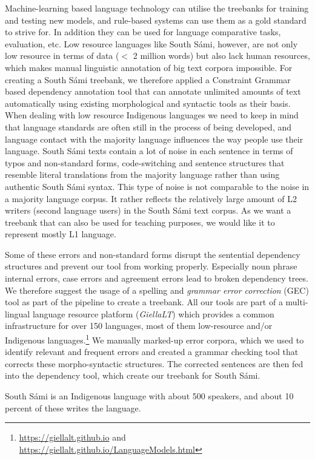 \documentclass[free]{flammie}
\begin{document}
Machine-learning based language technology can utilise the treebanks for
training and testing new models, and rule-based systems can use them as a gold
standard to strive for.  In addition they can be used for language comparative
tasks, evaluation, etc.  Low resource languages like South Sámi, however, are
not only low resource in terms of data ($<$ 2 million words) but also lack human
resources, which makes manual linguistic annotation of big text corpora
impossible.  For creating a South Sámi treebank, we therefore applied a
Constraint Grammar based dependency annotation tool that can annotate unlimited
amounts of text automatically using existing morphological and syntactic tools
as their basis.  When dealing with low resource Indigenous languages we need to
keep in mind that language standards are often still in the process of being
developed, and language contact with the majority language influences the way
people use their language. South Sámi texts contain a lot of noise in each
sentence in terms of typos and non-standard forms, code-switching and sentence
structures that resemble literal translations from the majority language rather
than using authentic South Sámi syntax.  This type of noise is not comparable to
the noise in a majority language corpus. It rather reflects the relatively large
amount of L2 writers (second language users) in the South Sámi text corpus. As
we want a treebank that can also be used for teaching purposes, we would like it
to represent mostly L1 language.

Some of these errors and non-standard forms disrupt the sentential dependency
structures and prevent our tool from working properly. Especially noun phrase
internal errors, case errors and agreement errors lead to broken dependency
trees.  We therefore suggest the usage of a spelling and \textit{grammar error
correction} (GEC) tool as part of the pipeline to create a treebank. All our
tools are part of a multi-lingual language resource platform (\textit{GiellaLT})
which provides a common infrastructure for over 150 languages, most of them
low-resource and/or Indigenous
languages.\footnote{\url{https://giellalt.github.io} and
\url{https://giellalt.github.io/LanguageModels.html}} We manually marked-up
error corpora, which we used to identify relevant and frequent errors and
created a grammar checking tool that corrects these morpho-syntactic structures.
The corrected sentences are then fed into the dependency tool, which create our
treebank for South Sámi.

South Sámi is an Indigenous language with about 500 speakers, and about 10
percent of these writes the language.
\end{document}
